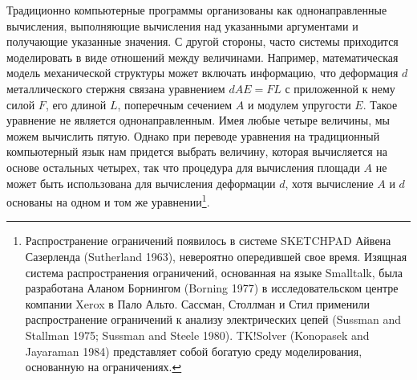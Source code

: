 %
%
%
%
Традиционно компьютерные программы организованы как
однонаправленные вычисления, выполняющие вычисления над указанными
аргументами и получающие указанные значения.  С другой стороны, часто
системы приходится моделировать в виде отношений между величинами.
Например, математическая модель механической структуры может включать
информацию, что деформация $d$ металлического стержня
связана уравнением
$dAE = FL$ с приложенной к нему силой $F$, его длиной
$L$, поперечным сечением $A$ и модулем упругости
$E$.
Такое уравнение не является однонаправленным.  Имея любые четыре
величины, мы можем вычислить пятую.  Однако при переводе уравнения на
традиционный компьютерный язык нам придется выбрать величину,
которая вычисляется на основе остальных четырех, так что процедура
для вычисления площади $A$ не может быть использована для
вычисления деформации $d$, хотя вычисление $A$ и
$d$ основаны на одном и том же уравнении\footnote{Распространение ограничений появилось в системе
SKETCHPAD Айвена Сазерленда (Sutherland 1963),
невероятно опередившей свое время.  Изящная система распространения
ограничений, основанная на языке Smalltalk, была разработана Аланом
Борнингом (Borning 1977)
в исследовательском центре
компании Xerox в Пало Альто.  Сассман, Столлман и Стил применили
распространение ограничений к анализу электрических цепей
(Sussman and Stallman 1975;
Sussman and Steele 1980).
TK!Solver (Konopasek and Jayaraman 1984)
представляет собой богатую
среду моделирования, основанную на ограничениях.}.

